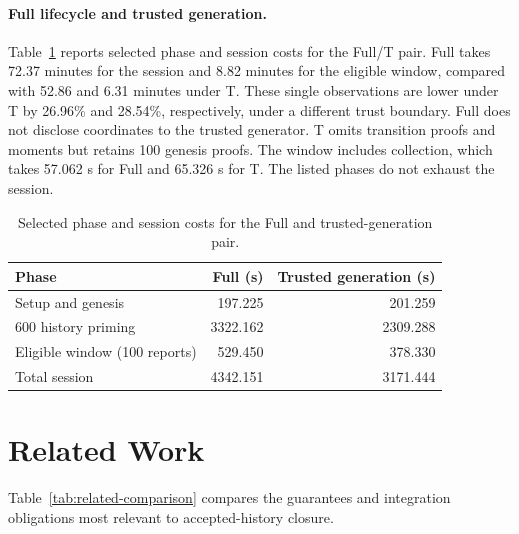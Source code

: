 \documentclass[conference,compsoc]{IEEEtran}
\theoremstyle{definition}
\numberwithin{equation}{section}
\numberwithin{table}{section}
\numberwithin{figure}{section}
\theoremstyle{plain}
\begin{document}
\paragraph{Full lifecycle and trusted generation.}
Table~\ref{tab:session-cost} reports selected phase and session costs for the Full/T pair. Full takes 72.37 minutes for the session and 8.82 minutes for the eligible window, compared with 52.86 and 6.31 minutes under T. These single observations are lower under T by 26.96\% and 28.54\%, respectively, under a different trust boundary. Full does not disclose coordinates to the trusted generator. T omits transition proofs and moments but retains 100 genesis proofs. The window includes collection, which takes 57.062 s for Full and 65.326 s for T. The listed phases do not exhaust the session.

\begin{table}[t]
\centering
\caption{Selected phase and session costs for the Full and trusted-generation pair.}
\label{tab:session-cost}
\footnotesize
\begin{tabular}{@{}lrr@{}}
\toprule
Phase & Full (s) & Trusted generation (s) \\
\midrule
Setup and genesis & 197.225 & 201.259 \\
600 history priming & 3322.162 & 2309.288 \\
Eligible window (100 reports) & 529.450 & 378.330 \\
Total session & 4342.151 & 3171.444 \\
\bottomrule
\end{tabular}
\end{table}

\section{Related Work}
\label{sec:related-work-summary}

Table~\ref{tab:related-comparison} compares the guarantees and integration
obligations most relevant to accepted-history closure.
\end{document}
